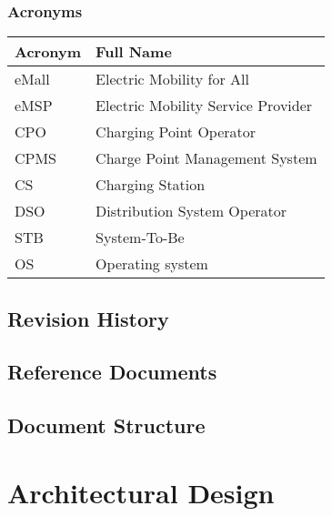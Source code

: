 \documentclass[11pt]{article}
\begin{document}
\subsubsection{Acronyms}

\begin{table}[H]
    \centering
    \setlength{\tabcolsep}{18pt}
    \renewcommand{\arraystretch}{1.2}
    \begin{tabularx}{\textwidth}{|>{\centering\hsize=0.3\hsize}X|>{\hsize=1.7\hsize}X|}
        \hline
        \textbf{Acronym} & \textbf{Full Name} \\
        \hline
        eMall & Electric Mobility for All \\
        \hline
        eMSP & Electric Mobility Service Provider \\
        \hline
        CPO & Charging Point Operator \\
        \hline
        CPMS & Charge Point Management System \\
        \hline
        CS & Charging Station \\
        \hline
        DSO & Distribution System Operator \\
        \hline
        STB & System-To-Be \\
        \hline
        OS & Operating system \\
        \hline
    \end{tabularx}
    \label{tab:acronyms}
\end{table}

\subsection{Revision History}

\subsection{Reference Documents}

\subsection{Document Structure}

\section{Architectural Design}

\end{document}
